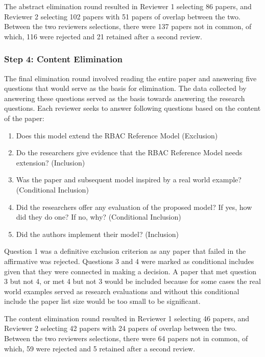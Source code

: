 The abstract elimination round resulted in Reviewer 1 selecting 86 papers, and Reviewer 2 selecting 102 papers with 51 papers of overlap between the two. 
Between the two reviewers selections, there were 137 papers not in common, of which, 116 were rejected and 21 retained after a second review.

\subsubsection{Step 4: Content Elimination}

The final elimination round involved reading the entire paper and answering five questions that would serve as the basis for elimination.  The data collected by answering these questions served as the basis towards answering the research questions.  Each reviewer seeks to answer following questions based on the content of the paper:

\begin{enumerate}
\setlength{\itemsep}{0.25pt}
\item Does this model extend the RBAC Reference Model (Exclusion)
\item Do the researchers give evidence that the RBAC Reference Model needs extension? (Inclusion)
\item Was the paper and subsequent model inspired by a real world example?  (Conditional Inclusion)
\item Did the researchers offer any evaluation of the proposed model? If yes, how did they do one? If no, why? (Conditional Inclusion)
\item Did the authors implement their model? (Inclusion)
\end{enumerate}

Question 1 was a definitive exclusion criterion as any paper that failed in the affirmative was rejected.  Questions 3 and 4 were marked as conditional includes given that they were connected in making a decision. 
A paper that met question 3 but not 4, or met 4 but not 3 would be included because for some cases the real world examples served as research evaluations and without this conditional include the paper list size would be too small to be significant.

The content elimination round resulted in Reviewer 1 selecting 46 papers, and Reviewer 2 selecting 42 papers with 24 papers of overlap between the two. 
Between the two reviewers selections, there were 64 papers not in common, of which, 59 were rejected and 5 retained after a second review.

